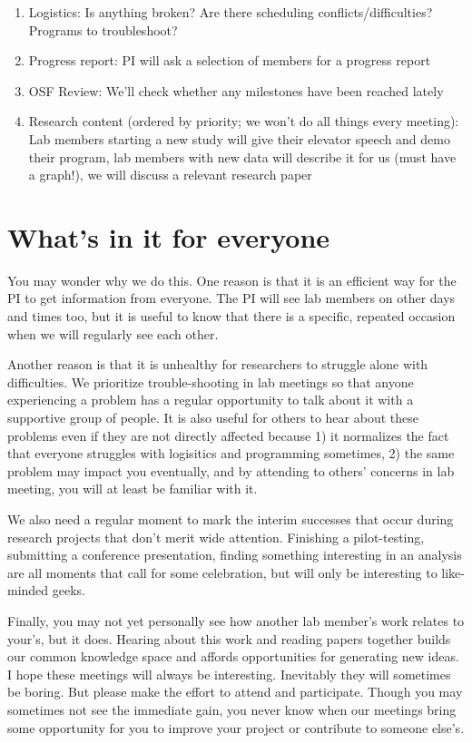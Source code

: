 \documentclass[12pt,]{book}
\providecommand{\tightlist}{%
  \setlength{\itemsep}{0pt}\setlength{\parskip}{0pt}}
\theoremstyle{definition}
\theoremstyle{definition}
\theoremstyle{definition}
\theoremstyle{remark}
\begin{document}
\begin{enumerate}
\def\labelenumi{\arabic{enumi}.}
\tightlist
\item
  Logistics: Is anything broken? Are there scheduling
  conflicts/difficulties? Programs to troubleshoot?
\item
  Progress report: PI will ask a selection of members for a progress
  report
\item
  OSF Review: We'll check whether any milestones have been reached
  lately
\item
  Research content (ordered by priority; we won't do all things every
  meeting): Lab members starting a new study will give their elevator
  speech and demo their program, lab members with new data will describe
  it for us (must have a graph!), we will discuss a relevant research
  paper
\end{enumerate}

\section{What's in it for everyone}\label{whats-in-it-for-everyone}

You may wonder why we do this. One reason is that it is an efficient way
for the PI to get information from everyone. The PI will see lab members
on other days and times too, but it is useful to know that there is a
specific, repeated occasion when we will regularly see each other.

Another reason is that it is unhealthy for researchers to struggle alone
with difficulties. We prioritize trouble-shooting in lab meetings so
that anyone experiencing a problem has a regular opportunity to talk
about it with a supportive group of people. It is also useful for others
to hear about these problems even if they are not directly affected
because 1) it normalizes the fact that everyone struggles with
logisitics and programming sometimes, 2) the same problem may impact you
eventually, and by attending to others' concerns in lab meeting, you
will at least be familiar with it.

We also need a regular moment to mark the interim successes that occur
during research projects that don't merit wide attention. Finishing a
pilot-testing, submitting a conference presentation, finding something
interesting in an analysis are all moments that call for some
celebration, but will only be interesting to like-minded geeks.

Finally, you may not yet personally see how another lab member's work
relates to your's, but it does. Hearing about this work and reading
papers together builds our common knowledge space and affords
opportunities for generating new ideas. I hope these meetings will
always be interesting. Inevitably they will sometimes be boring. But
please make the effort to attend and participate. Though you may
sometimes not see the immediate gain, you never know when our meetings
bring some opportunity for you to improve your project or contribute to
someone else's.
\end{document}
